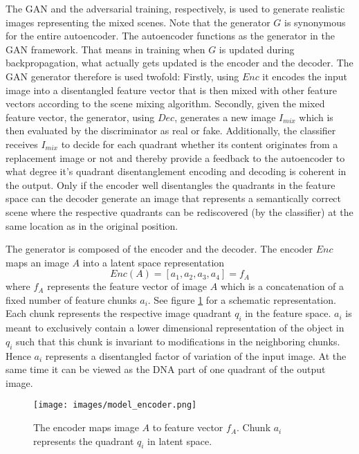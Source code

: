 \documentclass[12pt,a4paper]{article}
\begin{document}
The GAN and the adversarial training, respectively, is used to generate realistic images representing the mixed scenes. Note that the generator $G$ is synonymous for the entire autoencoder. The autoencoder functions as the generator in the GAN framework. That means in training when $G$ is updated during backpropagation, what actually gets updated is the encoder and the decoder. The GAN generator therefore is used twofold: Firstly, using $Enc$ it encodes the input image into a disentangled feature vector that is then mixed with other feature vectors according to the scene mixing algorithm. Secondly, given the mixed feature vector, the generator, using $Dec$, generates a new image $I_{mix}$ which is then evaluated by the discriminator as real or fake. Additionally, the classifier receives $I_{mix}$ to decide for each quadrant whether its content originates from a replacement image or not and thereby provide a feedback to the autoencoder to what degree it's quadrant disentanglement encoding and decoding is coherent in the output. Only if the encoder well disentangles the quadrants in the feature space can the decoder generate an image that represents a semantically correct scene where the respective quadrants can be rediscovered (by the classifier) at the same location as in the original position.

The generator is composed of the encoder and the decoder. The encoder $Enc$ maps an image $A$ into a latent space representation
\begin{equation} \label{eq:2}
    Enc(A) = [a_1, a_2, a_3, a_4] = f_A
\end{equation}
where $f_A$ represents the feature vector of image $A$ which is a concatenation of a fixed number of feature chunks $a_i$. See figure \ref{fig:encoder} for a schematic representation. Each chunk represents the respective image quadrant $q_i$ in the feature space. $a_i$ is meant to exclusively contain a lower dimensional representation of the object in $q_i$ such that this chunk is invariant to modifications in the neighboring chunks. Hence $a_i$ represents a disentangled factor of variation of the input image. At the same time it can be viewed as the DNA part of one quadrant of the output image.

\begin{figure}[ht]
\centering
\texttt{[image: images/model\_encoder.png]}
\caption{The encoder maps image $A$ to feature vector $f_A$. Chunk $a_i$ represents the quadrant $q_i$ in latent space.}
\label{fig:encoder}
\end{figure}
\end{document}
